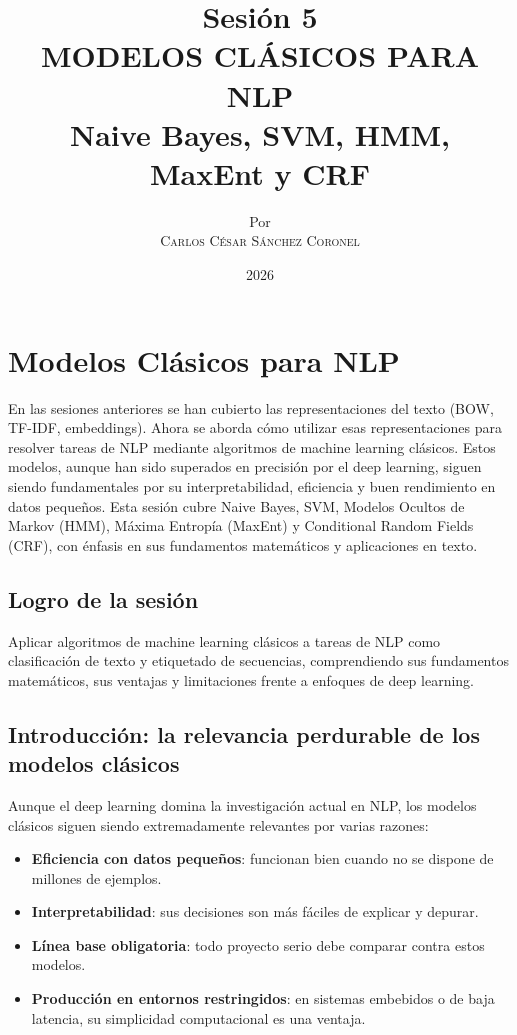 \documentclass[12pt,a4paper,openany,oneside]{book}
\title{
    \textbf{Sesión 5} \\ 
    \Huge \textbf{MODELOS CLÁSICOS PARA NLP} \\
    \Large Naive Bayes, SVM, HMM, MaxEnt y CRF
}
\author{
    \small Por \\ \vspace{0.2cm}
    \Large \textsc{Carlos César Sánchez Coronel}
}
\date{2026}
\begin{document}
\maketitle
\tableofcontents
{}

\chapter{Modelos Clásicos para NLP}

En las sesiones anteriores se han cubierto las representaciones del texto (BOW, TF-IDF, embeddings). Ahora se aborda cómo utilizar esas representaciones para resolver tareas de NLP mediante algoritmos de machine learning clásicos. Estos modelos, aunque han sido superados en precisión por el deep learning, siguen siendo fundamentales por su interpretabilidad, eficiencia y buen rendimiento en datos pequeños. Esta sesión cubre Naive Bayes, SVM, Modelos Ocultos de Markov (HMM), Máxima Entropía (MaxEnt) y Conditional Random Fields (CRF), con énfasis en sus fundamentos matemáticos y aplicaciones en texto.

\section{Logro de la sesión}
Aplicar algoritmos de machine learning clásicos a tareas de NLP como clasificación de texto y etiquetado de secuencias, comprendiendo sus fundamentos matemáticos, sus ventajas y limitaciones frente a enfoques de deep learning.

\section{Introducción: la relevancia perdurable de los modelos clásicos}
Aunque el deep learning domina la investigación actual en NLP, los modelos clásicos siguen siendo extremadamente relevantes por varias razones:
\begin{itemize}
    \item \textbf{Eficiencia con datos pequeños}: funcionan bien cuando no se dispone de millones de ejemplos.
    \item \textbf{Interpretabilidad}: sus decisiones son más fáciles de explicar y depurar.
    \item \textbf{Línea base obligatoria}: todo proyecto serio debe comparar contra estos modelos.
    \item \textbf{Producción en entornos restringidos}: en sistemas embebidos o de baja latencia, su simplicidad computacional es una ventaja.
\end{itemize}
\end{document}
